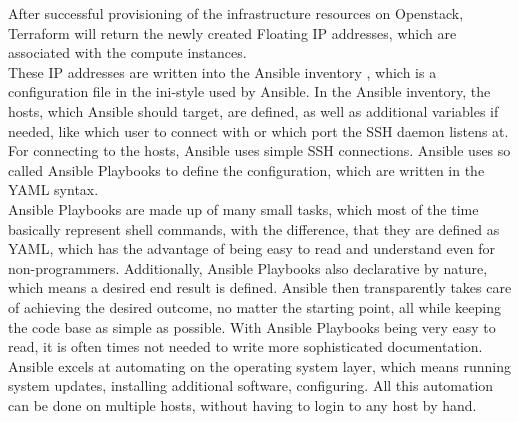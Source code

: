 \noindent
After successful provisioning of the infrastructure resources on Openstack,
Terraform will return the newly created Floating IP addresses, 
which are associated with the compute instances. \\

\noindent
These IP addresses are written
into the Ansible inventory \cite{ansibleInventoryWebsite}, which is a configuration
file in the ini-style used by Ansible. In the Ansible inventory, the hosts, which 
Ansible should target, are defined, as well as additional variables if needed,
like which user to connect with or which port the SSH daemon listens at.
For connecting to the hosts, Ansible uses simple SSH connections.
Ansible uses so called Ansible Playbooks \cite{ansiblePlaybooksWebsite}
to define the configuration, which are written in the YAML syntax. \\

\noindent
Ansible Playbooks are made up of many small tasks, which most of the time basically
represent shell commands, with the difference, that they are defined as YAML,
which has the advantage of being easy to read and understand even for non-programmers.
Additionally, Ansible Playbooks also declarative by nature, which means a desired end result 
is defined. Ansible then transparently takes care of achieving the desired outcome,
no matter the starting point, all while keeping the code base as simple as possible.
With Ansible Playbooks being very easy to read, it is often times not needed to write 
more sophisticated documentation.
Ansible excels at automating on the operating system layer,
which means running system updates, installing additional software,
configuring. All this automation can be done on multiple hosts, without 
having to login to any host by hand. 





